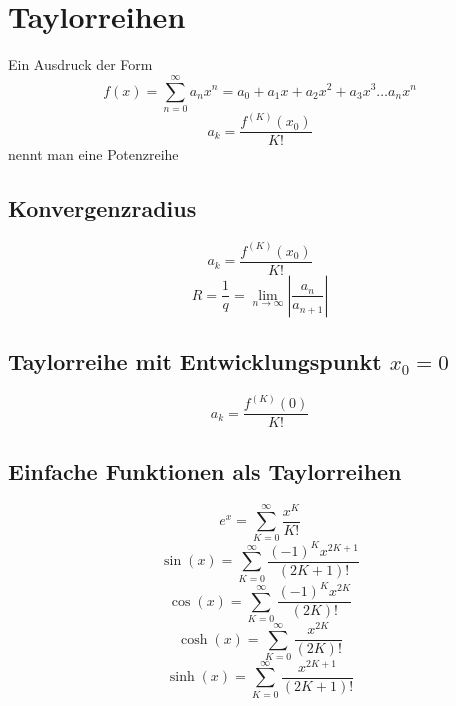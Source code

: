 \section{Taylorreihen}
Ein Ausdruck der Form 
\[ \boxed{f(x) = \sum_{n = 0}^{\infty} a_n x^n = a_0 + a_1 x + a_2 x^2 + a_3 x^3 \dots a_n x^n} \]
\[ \boxed{a_k = \frac{f^{(K)}(x_0)}{K!}} \]
nennt man eine Potenzreihe
\subsection{Konvergenzradius}
\[ \boxed{a_k = \frac{f^{(K)}(x_0)}{K!}} \]
\[ \boxed{R = \frac{1}{q} = \lim_{n \rightarrow \infty} \left| \frac{a_n}{a_{n + 1}} \right|} \]
\subsection{Taylorreihe mit Entwicklungspunkt $x_0 = 0$}
\[ \boxed{a_k = \frac{f^{(K)}(0)}{K!}} \]
\subsection{Einfache Funktionen als Taylorreihen}
\[ \boxed{e^x = \sum_{K=0}^{\infty} \frac{x^K}{K!}} \]
\[ \boxed{\sin(x) = \sum_{K=0}^{\infty} \frac{(-1)^K x^{2K+1}}{(2K+1)!}} \]
\[ \boxed{\cos(x) = \sum_{K=0}^{\infty} \frac{(-1)^K x^{2K}}{(2K)!}} \]
\[ \boxed{\cosh(x) = \sum_{K=0}^{\infty} \frac{x^{2K}}{(2K)!}} \]
\[ \boxed{\sinh(x) = \sum_{K=0}^{\infty} \frac{x^{2K+1}}{(2K+1)!}} \]

